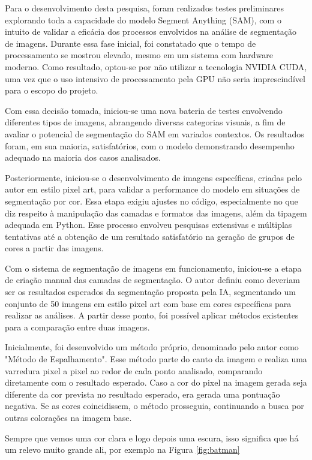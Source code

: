 Para o desenvolvimento desta pesquisa, foram realizados testes preliminares explorando toda a capacidade do modelo Segment Anything (SAM), com o intuito de validar a eficácia dos processos envolvidos na análise de segmentação de imagens. Durante essa fase inicial, foi constatado que o tempo de processamento se mostrou elevado, mesmo em um sistema com hardware moderno. Como resultado, optou-se por não utilizar a tecnologia NVIDIA CUDA, uma vez que o uso intensivo de processamento pela GPU não seria imprescindível para o escopo do projeto.

Com essa decisão tomada, iniciou-se uma nova bateria de testes envolvendo diferentes tipos de imagens, abrangendo diversas categorias visuais, a fim de avaliar o potencial de segmentação do SAM em variados contextos. Os resultados foram, em sua maioria, satisfatórios, com o modelo demonstrando desempenho adequado na maioria dos casos analisados.

Posteriormente, iniciou-se o desenvolvimento de imagens específicas, criadas pelo autor em estilo pixel art, para validar a performance do modelo em situações de segmentação por cor. Essa etapa exigiu ajustes no código, especialmente no que diz respeito à manipulação das camadas e formatos das imagens, além da tipagem adequada em Python. Esse processo envolveu pesquisas extensivas e múltiplas tentativas até a obtenção de um resultado satisfatório na geração de grupos de cores a partir das imagens.

Com o sistema de segmentação de imagens em funcionamento, iniciou-se a etapa de criação manual das camadas de segmentação. O autor definiu como deveriam ser os resultados esperados da segmentação proposta pela IA, segmentando um conjunto de 50 imagens em estilo pixel art com base em cores específicas para realizar as análises. A partir desse ponto, foi possível aplicar métodos existentes para a comparação entre duas imagens.

Inicialmente, foi desenvolvido um método próprio, denominado pelo autor como "Método de Espalhamento". Esse método parte do canto da imagem e realiza uma varredura pixel a pixel ao redor de cada ponto analisado, comparando diretamente com o resultado esperado. Caso a cor do pixel na imagem gerada seja diferente da cor prevista no resultado esperado, era gerada uma pontuação negativa. Se as cores coincidissem, o método prosseguia, continuando a busca por outras colorações na imagem base.


Sempre que vemos uma cor clara e logo depois uma escura, isso significa que há um relevo muito grande ali, por exemplo  na Figura \ref{fig:batman}

